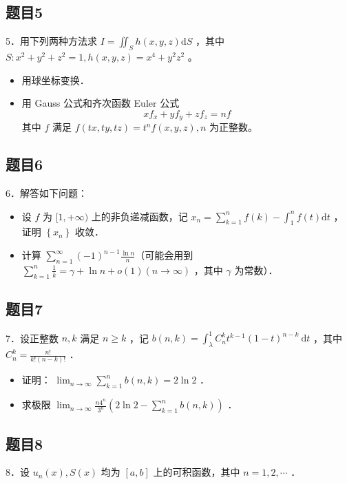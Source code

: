 \documentclass{article}
\begin{document}
\subsection{题目5}
5．用下列两种方法求 \(I=\iint_{S} h(x, y, z) \mathrm{d} S\) ，其中 \(S: x^{2}+y^{2}+z^{2}=1, h(x, y, z)=x^{4}+y^{2} z^{2}\) 。

\begin{itemize}
  \item[（1）] 用球坐标变换．
  \item[（2）] 用 Gauss 公式和齐次函数 Euler 公式
\[
x f_{x}+y f_{y}+z f_{z}=n f
\]
其中 \(f\) 满足 \(f(t x, t y, t z)=t^{n} f(x, y, z), n\) 为正整数。
\end{itemize}

\subsection{题目6}
6．解答如下问题：

\begin{itemize}
  \item[（1）] 设 \(f\) 为 \([1,+\infty)\) 上的非负递减函数，记 \(x_{n}=\sum_{k=1}^{n} f(k)-\int_{1}^{n} f(t) \mathrm{d} t\) ，证明 \(\left\{x_{n}\right\}\) 收敛．
  \item[（2）] 计算 \(\sum_{n=1}^{\infty}(-1)^{n-1} \frac{\ln n}{n}\)（可能会用到 \(\sum_{k=1}^{n} \frac{1}{k}=\gamma+\ln n+o(1)(n \rightarrow \infty)\) ，其中 \(\gamma\) 为常数）．
\end{itemize}

\subsection{题目7}
7．设正整数 \(n, k\) 满足 \(n \geq k\) ，记 \(b(n, k)=\int_{\lambda}^{1} C_{n}^{k} t^{k-1}(1-t)^{n-k} \mathrm{~d} t\) ，其中 \(C_{n}^{k}=\frac{n!}{k!(n-k)!}\) ．

\begin{itemize}
  \item[（1）] 证明： \(\lim _{n \rightarrow \infty} \sum_{k=1}^{n} b(n, k)=2 \ln 2\) ．
  \item[（2）] 求极限 \(\lim _{n \rightarrow \infty} \frac{n 4^{n}}{3^{n}}\left(2 \ln 2-\sum_{k=1}^{n} b(n, k)\right)\) ．
\end{itemize}

\subsection{题目8}
8．设 \(u_{n}(x), S(x)\) 均为 \([a, b]\) 上的可积函数，其中 \(n=1,2, \cdots\) ．
\end{document}
